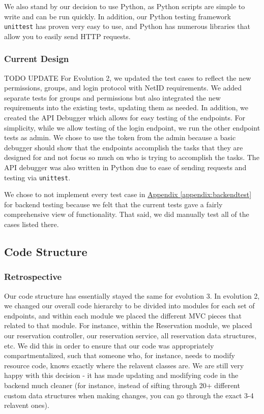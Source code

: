 \documentclass[12pt]{article}
\begin{document}
We also stand by our decision to use Python, as Python scripts are simple to write and can be run quickly. In addition, our Python testing framework  \texttt{unittest} has proven very easy to use, and Python has numerous libraries that allow you to easily send HTTP requests. 

\subsubsection{Current Design}
{\huge TODO UPDATE}
For Evolution 2, we updated the test cases to reflect the new permissions, groups, and login protocol with NetID requirements. We added separate tests for groups and permissions but also integrated the new requirements into the existing tests, updating them as needed. In addition, we created the API Debugger which allows for easy testing of the endpoints. For simplicity, while we allow testing of the login endpoint, we run the other endpoint tests as admin. We chose to use the token from the admin because a basic debugger should show that the endpoints accomplish the tasks that they are designed for and not focus so much on who is trying to accomplish the tasks. The API debugger was also written in Python due to ease of sending requests and testing via \texttt{unittest}. 

We chose to not implement every test case in \hyperref[appendix:backendtest]{Appendix \ref{appendix:backendtest}} for backend testing because we felt that the current tests gave a fairly comprehensive view of functionality. That said, we did manually test all of the cases listed there.


\subsection{Code Structure}
\subsubsection{Retrospective}
Our code structure has essentially stayed the same for evolution 3. In evolution 2, we changed our overall code hierarchy to be divided into modules for each set of endpoints, and within each module we placed the different MVC pieces that related to that module. For instance, within the Reservation module, we placed our reservation controller, our reservation service, all reservation data structures, etc. We did this in order to ensure that our code was appropriately compartmentalized, such that someone who, for instance, needs to modify resource code, knows exactly where the relavent classes are. We are still very happy with this decision - it has made updating and modifying code in the backend much cleaner (for instance, instead of sifting through 20+ different custom data structures when making changes, you can go through the exact 3-4 relavent ones). 
\end{document}
